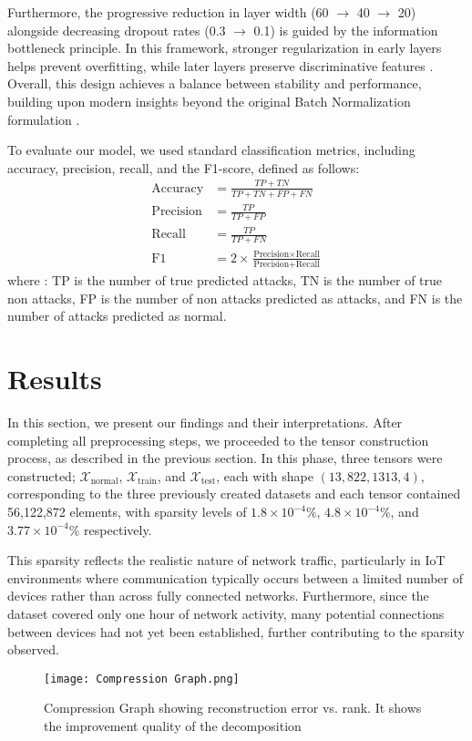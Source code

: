 \documentclass[preprint,12pt,authoryear]{elsarticle}
\begin{document}
Furthermore, the progressive reduction in layer width (60 $\rightarrow$ 40 $\rightarrow$ 20) alongside decreasing dropout rates (0.3 $\rightarrow$ 0.1) is guided by the information bottleneck principle. In this framework, stronger regularization in early layers helps prevent overfitting, while later layers preserve discriminative features \citep{labach2019survey, rippel2015spectral}. Overall, this design achieves a balance between stability and performance, building upon modern insights beyond the original Batch Normalization formulation \citep{ioffe2015batch}.

To evaluate our model, we used standard classification metrics, including accuracy, precision, recall, and the F1-score, defined as follows:
\begin{align}
\text{Accuracy} &= \frac{TP + TN}{TP + TN + FP + FN}\\
\text{Precision} &= \frac{TP}{TP + FP}\\
\text{Recall} &= \frac{TP}{TP + FN}\\
\text{F1} &= 2 \times \frac{\text{Precision} \times \text{Recall}}{\text{Precision} + \text{Recall}}
\end{align}
where :
 TP is the number of true predicted attacks,
TN  is the number of true non attacks,
FP is the number of non attacks predicted as attacks, and 
FN is the number of attacks predicted as normal.






\section{Results}
In this section, we present our findings and their interpretations.   After completing all preprocessing steps, we proceeded to the tensor construction process, as described in the previous section. In this phase, three tensors were constructed; $\mathcal{X}_{\text{normal}}$, $\mathcal{X}_{\text{train}}$, and $\mathcal{X}_{\text{test}}$, each with shape $(13, 822, 1313, 4)$, corresponding to the three previously created datasets and each tensor contained 56,122,872 elements, with sparsity levels of $1.8 \times 10^{-4}\%$, $4.8 \times 10^{-4}\%$, and $3.77 \times 10^{-4}\%$ respectively. 

This sparsity reflects the realistic nature of network traffic, particularly in IoT environments where communication typically occurs between a limited number of devices rather than across fully connected networks. Furthermore, since the dataset covered only one hour of network activity, many potential connections between devices had not yet been established, further contributing to the sparsity observed. 
\begin{figure}
    \centering
    \texttt{[image: Compression Graph.png]}
    \caption{Compression Graph showing reconstruction error vs. rank. It shows the improvement quality of the decomposition}
    \label{fig:Compression graph}
\end{figure}
\end{document}
